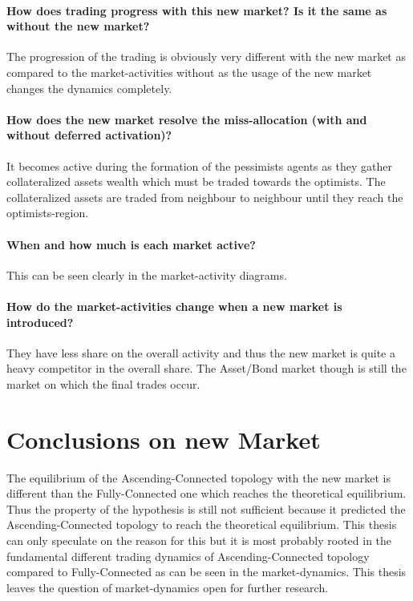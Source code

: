 \documentclass[Bachelorarbeit.tex]{subfiles}
\begin{document}
\paragraph{How does trading progress with this new market? Is it the same as without the new market?}
The progression of the trading is obviously very different with the new market as compared to the market-activities without as the usage of the new market changes the dynamics completely.

\paragraph{How does the new market resolve the miss-allocation (with and without deferred activation)?}
It becomes active during the formation of the pessimists agents as they gather collateralized assets wealth which must be traded towards the optimists. The collateralized assets are traded from neighbour to neighbour until they reach the optimists-region.

\paragraph{When and how much is each market active?}
This can be seen clearly in the market-activity diagrams.

\paragraph{How do the market-activities change when a new market is introduced?}
They have less share on the overall activity and thus the new market is quite a heavy competitor in the overall share. The Asset/Bond market though is still the market on which the final trades occur.

\section{Conclusions on new Market}
The equilibrium of the Ascending-Connected topology with the new market is different than the Fully-Connected one which reaches the theoretical equilibrium. Thus the property of the hypothesis is still not sufficient because it predicted the Ascending-Connected topology to reach the theoretical equilibrium. This thesis can only speculate on the reason for this but it is most probably rooted in the fundamental different trading dynamics of Ascending-Connected topology compared to Fully-Connected as can be seen in the market-dynamics. This thesis leaves the question of market-dynamics open for further research.
\end{document}
